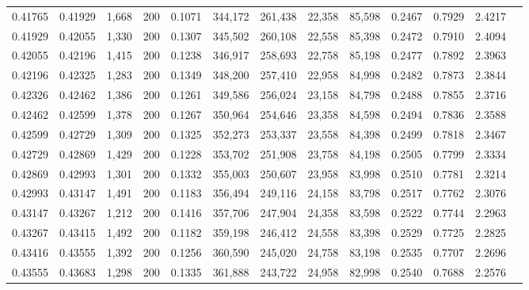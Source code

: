 \begin{tabular}{rrrrrrrrrrrrr}
0.41765 & 0.41929 &  1,668 & 200 &                                     0.1071 & 344,172 & 261,438 &  22,358 &  85,598 & 0.2467 & 0.7929 & 2.4217 \\
0.41929 & 0.42055 &  1,330 & 200 &                                     0.1307 & 345,502 & 260,108 &  22,558 &  85,398 & 0.2472 & 0.7910 & 2.4094 \\
0.42055 & 0.42196 &  1,415 & 200 &                                     0.1238 & 346,917 & 258,693 &  22,758 &  85,198 & 0.2477 & 0.7892 & 2.3963 \\
0.42196 & 0.42325 &  1,283 & 200 &                                     0.1349 & 348,200 & 257,410 &  22,958 &  84,998 & 0.2482 & 0.7873 & 2.3844 \\
0.42326 & 0.42462 &  1,386 & 200 &                                     0.1261 & 349,586 & 256,024 &  23,158 &  84,798 & 0.2488 & 0.7855 & 2.3716 \\
0.42462 & 0.42599 &  1,378 & 200 &                                     0.1267 & 350,964 & 254,646 &  23,358 &  84,598 & 0.2494 & 0.7836 & 2.3588 \\
0.42599 & 0.42729 &  1,309 & 200 &                                     0.1325 & 352,273 & 253,337 &  23,558 &  84,398 & 0.2499 & 0.7818 & 2.3467 \\
0.42729 & 0.42869 &  1,429 & 200 &                                     0.1228 & 353,702 & 251,908 &  23,758 &  84,198 & 0.2505 & 0.7799 & 2.3334 \\
0.42869 & 0.42993 &  1,301 & 200 &                                     0.1332 & 355,003 & 250,607 &  23,958 &  83,998 & 0.2510 & 0.7781 & 2.3214 \\
0.42993 & 0.43147 &  1,491 & 200 &                                     0.1183 & 356,494 & 249,116 &  24,158 &  83,798 & 0.2517 & 0.7762 & 2.3076 \\
0.43147 & 0.43267 &  1,212 & 200 &                                     0.1416 & 357,706 & 247,904 &  24,358 &  83,598 & 0.2522 & 0.7744 & 2.2963 \\
0.43267 & 0.43415 &  1,492 & 200 &                                     0.1182 & 359,198 & 246,412 &  24,558 &  83,398 & 0.2529 & 0.7725 & 2.2825 \\
0.43416 & 0.43555 &  1,392 & 200 &                                     0.1256 & 360,590 & 245,020 &  24,758 &  83,198 & 0.2535 & 0.7707 & 2.2696 \\
0.43555 & 0.43683 &  1,298 & 200 &                                     0.1335 & 361,888 & 243,722 &  24,958 &  82,998 & 0.2540 & 0.7688 & 2.2576 \\

\end{tabular}

